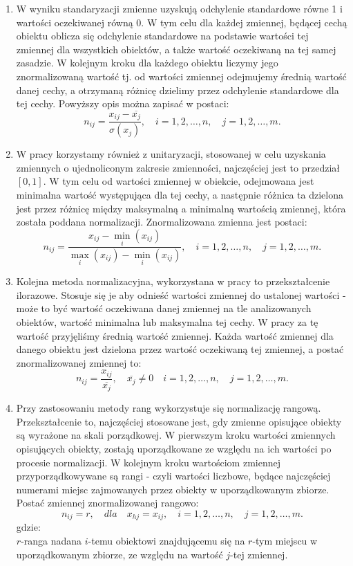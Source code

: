 \documentclass[12pt,a4paper]{report}
\begin{document}
\begin{enumerate}
\item W wyniku standaryzacji zmienne uzyskują odchylenie standardowe równe 1 i wartości oczekiwanej  równą 0. W tym celu dla każdej zmiennej, będącej cechą obiektu oblicza się odchylenie standardowe na podstawie wartości tej zmiennej dla wszystkich obiektów, a także wartość oczekiwaną na tej samej zasadzie. W kolejnym kroku dla każdego obiektu liczymy jego znormalizowaną wartość tj. od wartości zmiennej odejmujemy średnią wartość danej cechy, a otrzymaną różnicę dzielimy przez odchylenie standardowe dla tej cechy. Powyższy opis można zapisać w postaci: 
$$
n_{ij}=\frac{x_{ij} - \overline{x_{j}}}{\sigma(x_j)}, \quad i = 1,2, \ldots, n, \quad j=1,2,\ldots, m.
$$



\item W pracy korzystamy również z unitaryzacji, stosowanej w celu uzyskania zmiennych o ujednoliconym zakresie zmienności, najczęściej jest to przedział $[0,1]$. W tym celu od wartości zmiennej w obiekcie, odejmowana jest minimalna wartość występująca dla tej cechy, a następnie różnica ta dzielona jest przez różnicę między maksymalną a minimalną wartością zmiennej, która została poddana normalizacji. Znormalizowana zmienna jest postaci:
$$
n_{ij}=\frac{x_{ij} - \min\limits_{i}(x_{ij})}{\max\limits_{i} (x_{ij}) - \min\limits_{i} (x_{ij})}, \quad i = 1,2, \ldots, n, \quad j=1,2,\ldots, m. 
$$
\item Kolejna metoda normalizacyjna, wykorzystana w pracy to przekształcenie ilorazowe. Stosuje się  je aby odnieść wartości zmiennej do ustalonej wartości - może to być wartość oczekiwana danej zmiennej na tle analizowanych obiektów, wartość minimalna lub maksymalna tej cechy. W pracy za tę wartość przyjęliśmy średnią wartość zmiennej. Każda wartość zmiennej dla danego obiektu jest dzielona przez wartość oczekiwaną tej zmiennej, a postać znormalizowanej zmiennej to:
$$
n_{ij}=\frac{x_{ij}}{\overline{x_j}}, \quad \overline{x_j} \neq 0 \quad i = 1,2, \ldots, n, \quad j=1,2,\ldots, m.
$$ 
\item Przy zastosowaniu metody rang wykorzystuje się normalizację rangową. Przekształcenie to, najczęściej stosowane jest, gdy zmienne opisujące obiekty są wyrażone na skali porządkowej. W pierwszym kroku wartości zmiennych opisujących obiekty, zostają uporządkowane ze względu na ich wartości po procesie normalizacji. W kolejnym kroku wartościom zmiennej przyporządkowywane są rangi - czyli wartości liczbowe, będące najczęściej numerami miejsc zajmowanych przez obiekty w uporządkowanym zbiorze. Postać zmiennej znormalizowanej rangowo:
$$
n_{ij}=r, \quad dla \quad x_{hj}=x_{ij}, \quad i = 1,2, \ldots, n, \quad j=1,2,\ldots, m.
$$
gdzie:\\ 
$r$-ranga nadana $i$-temu obiektowi znajdującemu się na $r$-tym miejscu w uporządkowanym zbiorze, ze względu na wartość $j$-tej zmiennej. 
\end{enumerate}
\end{document}
